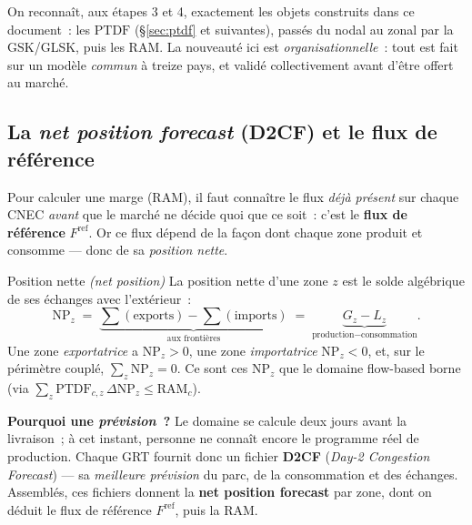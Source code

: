 \documentclass[11pt,a4paper]{article}
\newcommand{\NP}{\mathrm{NP}}
\newcommand{\PTDF}{\mathrm{PTDF}}
\newcommand{\RAM}{\mathrm{RAM}}
\newcommand{\Fmax}{F^{\max}}
\newcommand{\Fref}{F^{\mathrm{ref}}}
\newcommand{\FRM}{\mathrm{FRM}}
\newcommand{\GSK}{\mathrm{GSK}}
\begin{document}
On reconnaît, aux étapes 3 et 4, exactement les objets construits dans ce
document~: les $\PTDF$ (§\ref{sec:ptdf} et suivantes), passés du nodal au zonal
par la $\GSK$/GLSK, puis les RAM. La nouveauté ici est \emph{organisationnelle}~:
tout est fait sur un modèle \emph{commun} à treize pays, et validé
collectivement avant d'être offert au marché.

\subsection{La \emph{net position forecast} (D2CF) et le flux de référence}
\label{sec:npf}

Pour calculer une marge (RAM), il faut connaître le flux \emph{déjà présent}
sur chaque CNEC \emph{avant} que le marché ne décide quoi que ce soit~: c'est
le \textbf{flux de référence} $\Fref$. Or ce flux dépend de la façon dont
chaque zone produit et consomme — donc de sa \emph{position nette}.

\begin{defbox}{Position nette \textit{(net position)}}
La position nette d'une zone $z$ est le solde algébrique de ses échanges avec
l'extérieur~:
\[
  \NP_z \;=\; \underbrace{\textstyle\sum(\text{exports})-\sum(\text{imports})}_{\text{aux frontières}}
        \;=\; \underbrace{G_z - L_z}_{\text{production}-\text{consommation}} .
\]
Une zone \emph{exportatrice} a $\NP_z>0$, une zone \emph{importatrice}
$\NP_z<0$, et, sur le périmètre couplé, $\sum_z \NP_z = 0$. Ce sont ces
$\NP_z$ que le domaine flow-based borne (via $\sum_z \PTDF_{c,z}\,\Delta\NP_z
\le \RAM_c$).
\end{defbox}

\noindent\textbf{Pourquoi une \emph{prévision}~?} Le domaine se calcule deux
jours avant la livraison~; à cet instant, personne ne connaît encore le
programme réel de production. Chaque GRT fournit donc un fichier
\textbf{D2CF} (\emph{Day-2 Congestion Forecast}) — sa \emph{meilleure
prévision} du parc, de la consommation et des échanges. Assemblés, ces
fichiers donnent la \textbf{net position forecast} par zone, dont on déduit le
flux de référence $\Fref$, puis la RAM.

\begin{center}
\end{center}
\end{document}
